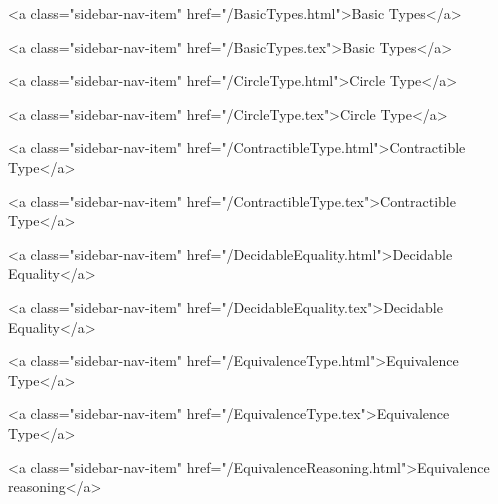       
        
          <a class="sidebar-nav-item" href="/BasicTypes.html">Basic Types</a>
        
      
    
      
        
          <a class="sidebar-nav-item" href="/BasicTypes.tex">Basic Types</a>
        
      
    
      
        
          <a class="sidebar-nav-item" href="/CircleType.html">Circle Type</a>
        
      
    
      
        
          <a class="sidebar-nav-item" href="/CircleType.tex">Circle Type</a>
        
      
    
      
        
          <a class="sidebar-nav-item" href="/ContractibleType.html">Contractible Type</a>
        
      
    
      
        
          <a class="sidebar-nav-item" href="/ContractibleType.tex">Contractible Type</a>
        
      
    
      
        
          <a class="sidebar-nav-item" href="/DecidableEquality.html">Decidable Equality</a>
        
      
    
      
        
          <a class="sidebar-nav-item" href="/DecidableEquality.tex">Decidable Equality</a>
        
      
    
      
        
          <a class="sidebar-nav-item" href="/EquivalenceType.html">Equivalence Type</a>
        
      
    
      
        
          <a class="sidebar-nav-item" href="/EquivalenceType.tex">Equivalence Type</a>
        
      
    
      
        
          <a class="sidebar-nav-item" href="/EquivalenceReasoning.html">Equivalence reasoning</a>
        
